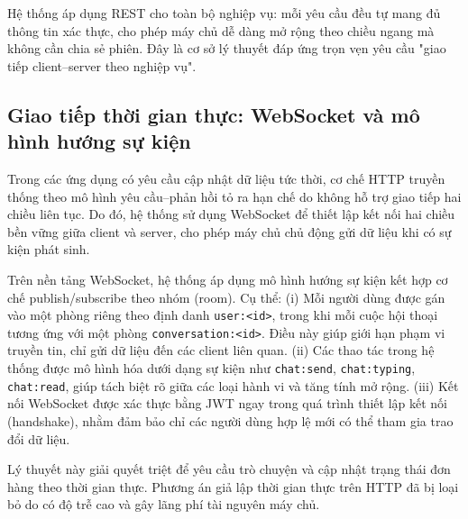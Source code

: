 \documentclass[../main.tex]{subfiles}%
\begin{document}
Hệ thống áp dụng REST cho toàn bộ nghiệp vụ: mỗi yêu cầu đều tự mang đủ thông tin xác thực, cho phép máy chủ dễ dàng mở rộng theo chiều ngang mà không cần chia sẻ phiên. Đây là cơ sở lý thuyết đáp ứng trọn vẹn yêu cầu "giao tiếp client–server theo nghiệp vụ".

\subsection{Giao tiếp thời gian thực: WebSocket và mô hình hướng sự kiện}

Trong các ứng dụng có yêu cầu cập nhật dữ liệu tức thời, cơ chế HTTP truyền thống theo mô hình yêu cầu–phản hồi tỏ ra hạn chế do không hỗ trợ giao tiếp hai chiều liên tục. Do đó, hệ thống sử dụng WebSocket để thiết lập kết nối hai chiều bền vững giữa client và server, cho phép máy chủ chủ động gửi dữ liệu khi có sự kiện phát sinh.

Trên nền tảng WebSocket, hệ thống áp dụng mô hình hướng sự kiện kết hợp cơ chế publish/subscribe theo nhóm (room). Cụ thể: (i) Mỗi người dùng được gán vào một phòng riêng theo định danh \texttt{user:<id>}, trong khi mỗi cuộc hội thoại tương ứng với một phòng \texttt{conversation:<id>}. Điều này giúp giới hạn phạm vi truyền tin, chỉ gửi dữ liệu đến các client liên quan.
(ii) Các thao tác trong hệ thống được mô hình hóa dưới dạng sự kiện như \texttt{chat:send}, \texttt{chat:typing}, \texttt{chat:read}, giúp tách biệt rõ giữa các loại hành vi và tăng tính mở rộng. (iii) Kết nối WebSocket được xác thực bằng JWT ngay trong quá trình thiết lập kết nối (handshake), nhằm đảm bảo chỉ các người dùng hợp lệ mới có thể tham gia trao đổi dữ liệu.

Lý thuyết này giải quyết triệt để yêu cầu trò chuyện và cập nhật trạng thái đơn hàng theo thời gian thực. Phương án giả lập thời gian thực trên HTTP đã bị loại bỏ do có độ trễ cao và gây lãng phí tài nguyên máy chủ.
\end{document}
